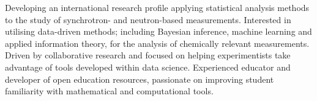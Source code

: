 \vspace{0.25cm}

\begin{cvparagraph}

Developing an international research profile applying statistical analysis methods to the study of synchrotron- and neutron-based measurements. 
Interested in utilising data-driven methods; including Bayesian inference, machine learning and applied information theory, for the analysis of chemically relevant measurements.
Driven by collaborative research and focused on helping experimentists take advantage of tools developed within data science. 
Experienced educator and developer of open education resources, passionate on improving student familiarity with mathematical and computational tools.
\end{cvparagraph}